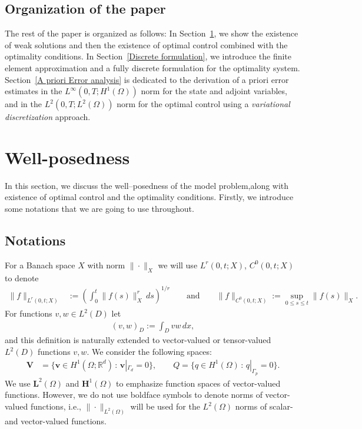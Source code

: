 \documentclass{amsart}
\begin{document}
\subsection{Organization of the paper}
The rest of the paper is organized as follows: In Section~\ref{Model problem and its well-posedness}, we show the existence of weak solutions and then the existence of optimal control combined with the optimality conditions. In Section~\ref{Discrete formulation}, we introduce the finite element approximation and a fully discrete formulation for the optimality system. Section~\ref{A priori Error analysis} is dedicated to the derivation of a priori error estimates in the $L^{\infty}(0,T;H^1(\Omega))$ norm for the state and adjoint variables, and in the $L^{2}(0,T;L^2(\Omega))$ norm for the optimal control using a \textit{variational discretization} approach. 
\section{Well-posedness}\label{Model problem and its well-posedness}
In this section, we discuss the well--posedness of the model problem,along with existence of optimal control and the optimality conditions. Firstly, we introduce some notations that we are going to use throughout.
\vspace{-1mm}
\subsection{Notations}
For a Banach space $X$ with norm $\|\cdot \|_X$ we will use $L^r(0,t; X)$, $C^0(0,t; X)$ to denote \vspace{-2mm}
%
\begin{align*}
	\| f \|_{L^r(0,t;X)} &:= \left( \int_0^t \| f(s) \|_X^r \,ds \right)^{1/r} 
	\qquad \text{and} \qquad
	\| f \|_{C^0(0,t;X)} := \sup_{0\le s\le t} \| f(s) \|_X. 
\end{align*}
%
For functions $v, w \in L^2(D)$ let
%
\begin{align*}
    (v, w)_{D} := \int_{D} v w \,dx ,
\end{align*}
%
and this definition is naturally extended to vector-valued or tensor-valued $L^2(D)$ functions $v, w$. 
We consider the following spaces:
%
\begin{align}
	\boldsymbol{V}&= \{\boldsymbol{v} \in H^1(\Omega; \mathbb{R}^d) \,:\, \boldsymbol{v}|_{\Gamma_d} = 0\},\qquad
	Q= \{ q \in H^1(\Omega) \,:\, q|_{\Gamma_p} = 0 \}.     
\end{align}
%
We use $\boldsymbol{L}^2(\Omega)$ and $\boldsymbol{H}^1(\Omega)$ to emphasize function spaces of vector-valued functions. However, we do not use boldface symbols to denote norms of vector-valued functions, i.e., $\| \cdot \|_{L^2(\Omega)}$ will be used for the $L^2(\Omega)$ norms of scalar- and vector-valued functions.
\end{document}
